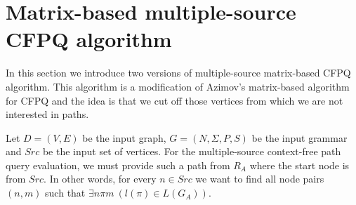 \section{Matrix-based multiple-source CFPQ algorithm}

 In this section we introduce two versions of multiple-source matrix-based CFPQ algorithm. This algorithm is a modification of Azimov's matrix-based algorithm for CFPQ and the idea is that we cut off those vertices from which we are not interested in paths.
 
 Let \mbox{$D = (V, E)$} be the input graph, \mbox{$G = (N, \Sigma, P, S)$} be the input grammar and $Src$ be the input set of vertices. For the multiple-source context-free path query evaluation, we must provide such a path from $R_A$ where the start node is from $Src$. In other words, for every \mbox{$n \in Src$} we want to find all node pairs \mbox{$(n,m)$} such that \mbox{$\exists n \pi m~(l(\pi) \in L(G_A))$}.

